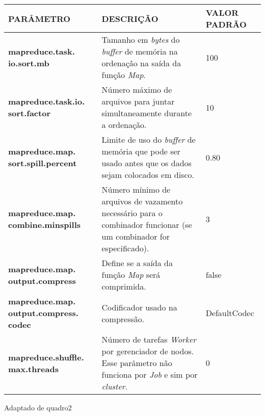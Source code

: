{\footnotesize
  \centering
  \begin{tabular}{|p{30mm}|p{50mm}|p{35mm}|}\hline
    \textbf{PARÂMETRO}                             & \textbf{DESCRIÇÃO}                                                                                                                   & \textbf{VALOR PADRÃO} \\\hline
    \textbf{mapreduce.task. io.sort.mb}            & Tamanho em \textit{\gls{byte}s} do \textit{\gls{buffer}} de memória na ordenação na saída da função \textit{Map}.                    & 100                   \\\hline
    \textbf{mapreduce.task.io. sort.factor}        & Número máximo de arquivos para juntar simultaneamente durante a ordenação.                                                           & 10                    \\\hline
    \textbf{mapreduce.map. sort.spill.percent}     & Limite de uso do \textit{\gls{buffer}} de memória que pode ser usado antes que os dados sejam colocados em disco.                    & 0.80                  \\\hline
    \textbf{mapreduce.map. combine.minspills}      & Número mínimo de arquivos de vazamento necessário para o combinador funcionar (se um combinador for especificado).                   & 3                     \\\hline
    \textbf{mapreduce.map. output.compress}        & Define se a saída da função \textit{Map} será comprimida.                                                                            & false                 \\\hline
    \textbf{mapreduce.map. output.compress. codec} & Codificador usado na compressão.                                                                                                     & DefaultCodec          \\\hline
    \textbf{mapreduce.shuffle. max.threads}        & Número de tarefas \textit{Worker} por gerenciador de nodos. Esse parâmetro não funciona por \textit{Job} e sim por \textit{cluster}. & 0                     \\\hline
  \end{tabular}}
{Adaptado de \cite{HadoopDocs321}}{quadro2}{}{}


